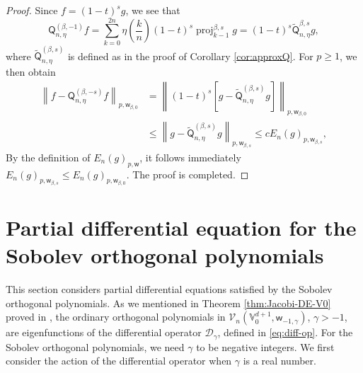 \documentclass{amsart}
\theoremstyle{remark}
\def\d{\mathrm{d}}
\def\sw{{\mathsf w}}
\def\sQ{{\mathsf Q}}
\def\sS{{\mathsf S}}
\def\b{{\beta}}
\def\g{{\gamma}}
\def\o{{\omega}}
\def\s{\sigma}
\def\CD{{\mathcal D}}
\def\CV{{\mathcal V}}
\def\VV{{\mathbb V}}
\def\proj{\operatorname{proj}}
\newcommand{\wt}{\widetilde}
\begin{document}
\begin{proof}
Since $f = (1-t)^s g$, we see that
$$
\sQ_{n,\eta}^{(\beta, -1)} f = \sum_{k=0}^{2n} \eta\left( \frac{k}{n}\right) (1-t)^s \proj_{k-1}^{\b,s} g
    = (1-t)^s \wt \sQ_{n,\eta}^{\beta,s} g,
$$
where $\wt \sQ_{n,\eta}^{(\beta,s)}$ is defined as in the proof of Corollary \ref{cor:approxQ}.
For $p \ge 1$, we then obtain
\begin{align*}
  \left \| f - \sQ_{n,\eta}^{(\beta, -s)} f \right\|_{p, \sw_{\b,0}}
  & =  \left \| (1-t)^s \left[ g - \wt \sQ_{n,\eta}^{(\beta, s)} g \right] \right\|_{p, \sw_{\b,0}}\\
  & \le \left \|g - \wt \sQ_{n,\eta}^{(\beta, s)} g \right\|_{p, \sw_{\b,s}} \le c E_n(g)_{p, \sw_{\b,s}},
\end{align*}
By the definition of $E_n(g)_{p, \sw}$, it follows immediately $E_n(g)_{p, \sw_{\b,s}} \le E_n(g)_{p, \sw_{\b,0}}$.
The proof is completed.
\end{proof}

\section{Partial differential equation for the Sobolev orthogonal polynomials}
\setcounter{equation}{0}

This section considers partial differential equations satisfied by the Sobolev orthogonal polynomials.
As we mentioned in Theorem \ref{thm:Jacobi-DE-V0} proved in \cite{X20}, the ordinary orthogonal polynomials
in $\CV_n(\VV_0^{d+1}, \sw_{-1,\g})$, $\g > -1$, are eigenfunctions of the differential operator $\CD_{\g}$,
defined in \eqref{eq:diff-op}. For the Sobolev orthogonal polynomials, we need $\g$ to be negative integers.
We first consider the action of the differential operator when $\g$ is a real number.
\end{document}
